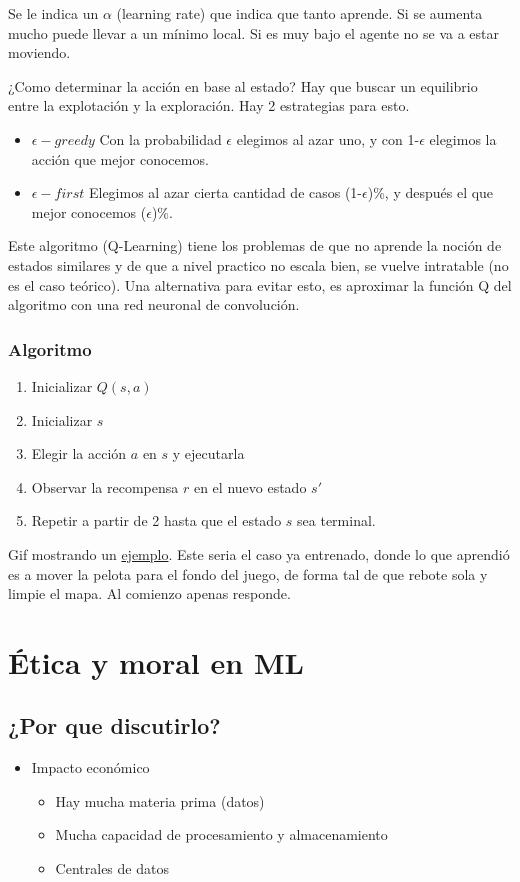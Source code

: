 \documentclass[titlepage,a4paper]{article}
\begin{document}
Se le indica un $\alpha$ (learning rate) que indica que tanto aprende. Si se aumenta mucho puede llevar a un mínimo local. Si es muy bajo el agente no se va a estar moviendo.

¿Como determinar la acción en base al estado? Hay que buscar un equilibrio entre la explotación y la exploración. Hay 2 estrategias para esto.

\begin{itemize}
    \item $\epsilon-greedy$ Con la probabilidad $\epsilon$ elegimos al azar uno, y con 1-$\epsilon$ elegimos la acción que mejor conocemos.
    \item $\epsilon-first$ Elegimos al azar cierta cantidad de casos (1-$\epsilon$)\%, y después el que mejor conocemos ($\epsilon$)\%. 
\end{itemize}

Este algoritmo (Q-Learning) tiene los problemas de que no aprende la noción de estados similares y de que a nivel practico no escala bien, se vuelve intratable (no es el caso teórico). Una alternativa para evitar esto, es aproximar la función Q del algoritmo con una red neuronal de convolución.

\subsubsection*{Algoritmo}
\begin{enumerate}
    \item Inicializar $Q(s,a)$
    \item Inicializar $s$
    \item Elegir la acción $a$ en $s$ y ejecutarla
    \item Observar la recompensa $r$ en el nuevo estado $s'$
    \item Repetir a partir de 2 hasta que el estado $s$ sea terminal.
\end{enumerate}

Gif mostrando un \href{http://ikuz.eu/wp-content/uploads/2015/02/breakout.gif}{ejemplo}. Este seria el caso ya entrenado, donde lo que aprendió es a mover la pelota para el fondo del juego, de forma tal de que rebote sola y limpie el mapa. Al comienzo apenas responde.

\newpage

\section{Ética y moral en ML}
\subsection{¿Por que discutirlo?}
\begin{itemize}
    \item Impacto económico
    \begin{itemize}
        \item Hay mucha materia prima (datos)
        \item Mucha capacidad de procesamiento y almacenamiento
        \item Centrales de datos
    \end{itemize}
\end{itemize}
\end{document}

